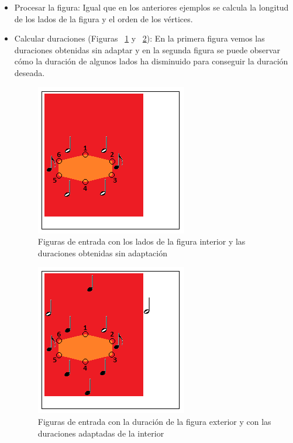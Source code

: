 \begin{itemize}

	\item Procesar la figura: Igual que en los anteriores ejemplos se calcula la longitud de los lados de la figura y el orden de los vértices.

	\item Calcular duraciones (Figuras ~\ref{fig:Figura1Voz2} y ~\ref{fig:Figura2Voz2}): En la primera figura vemos las duraciones obtenidas sin adaptar y en la segunda figura se puede observar cómo la duración de algunos lados ha disminuido para conseguir la duración deseada.

 		\begin{figure}[!htbp]
		\centering
		\hspace*{0.0in}
		\includegraphics[scale=1]{graphics/simpletest4-F2.png}
		\caption{Figuras de entrada con los lados de la figura interior y las duraciones obtenidas sin adaptación}
		\label{fig:Figura1Voz2}
		\end{figure}

		\begin{figure}[!htbp]
		\centering
		\hspace*{0.0in}
		\includegraphics[scale=1]{graphics/simpletest4-F2_2.png}
		\caption{Figuras de entrada con la duración de la figura exterior y con las duraciones adaptadas de la interior}
		\label{fig:Figura2Voz2}
		\end{figure}


\end{itemize}
